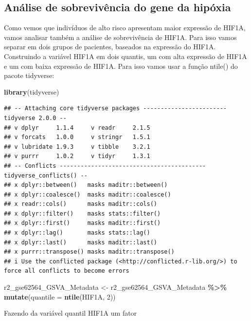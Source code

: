 \documentclass[
]{book}
\newenvironment{Shaded}{\begin{snugshade}}{\end{snugshade}}
\newcommand{\AttributeTok}[1]{\textcolor[rgb]{0.13,0.29,0.53}{#1}}
\newcommand{\DecValTok}[1]{\textcolor[rgb]{0.00,0.00,0.81}{#1}}
\newcommand{\FunctionTok}[1]{\textcolor[rgb]{0.13,0.29,0.53}{\textbf{#1}}}
\newcommand{\NormalTok}[1]{#1}
\newcommand{\OtherTok}[1]{\textcolor[rgb]{0.56,0.35,0.01}{#1}}
\newcommand{\SpecialCharTok}[1]{\textcolor[rgb]{0.81,0.36,0.00}{\textbf{#1}}}
\begin{document}
\subsection{Análise de sobrevivência do gene da hipóxia}\label{anuxe1lise-de-sobrevivuxeancia-do-gene-da-hipuxf3xia}

Como vemos que indivíduos de alto risco apresentam maior expressão de HIF1A, vamos analisar também a análise de sobrevivência de HIF1A. Para isso vamos separar em dois grupos de pacientes, baseados na expressão do HIF1A. Construindo a variável HIF1A em dois quantis, um com alta expressão de HIF1A e um com baixa expressão de HIF1A. Para isso vamos usar a função ntile() do pacote tidyverse:

\begin{Shaded}
\begin{Highlighting}[]
\FunctionTok{library}\NormalTok{(tidyverse)}
\end{Highlighting}
\end{Shaded}

\begin{verbatim}
## -- Attaching core tidyverse packages ------------------------ tidyverse 2.0.0 --
## v dplyr     1.1.4     v readr     2.1.5
## v forcats   1.0.0     v stringr   1.5.1
## v lubridate 1.9.3     v tibble    3.2.1
## v purrr     1.0.2     v tidyr     1.3.1
## -- Conflicts ------------------------------------------ tidyverse_conflicts() --
## x dplyr::between()   masks maditr::between()
## x dplyr::coalesce()  masks maditr::coalesce()
## x readr::cols()      masks maditr::cols()
## x dplyr::filter()    masks stats::filter()
## x dplyr::first()     masks maditr::first()
## x dplyr::lag()       masks stats::lag()
## x dplyr::last()      masks maditr::last()
## x purrr::transpose() masks maditr::transpose()
## i Use the conflicted package (<http://conflicted.r-lib.org/>) to force all conflicts to become errors
\end{verbatim}

\begin{Shaded}
\begin{Highlighting}[]
\NormalTok{r2\_gse62564\_GSVA\_Metadata }\OtherTok{\textless{}{-}}\NormalTok{ r2\_gse62564\_GSVA\_Metadata }\SpecialCharTok{\%\textgreater{}\%}
    \FunctionTok{mutate}\NormalTok{(}\AttributeTok{quantile =} \FunctionTok{ntile}\NormalTok{(HIF1A, }\DecValTok{2}\NormalTok{))}
\end{Highlighting}
\end{Shaded}

Fazendo da variável quantil HIF1A um fator
\end{document}
